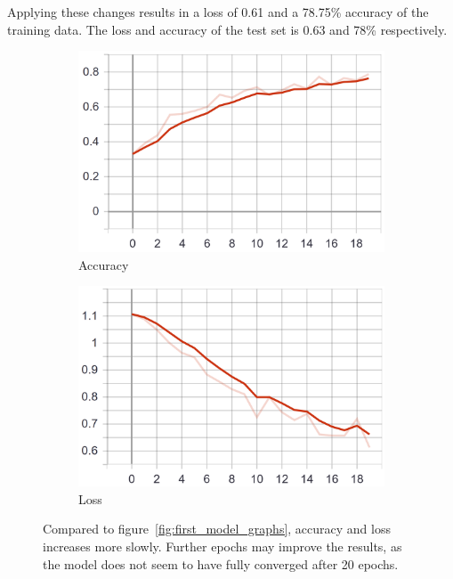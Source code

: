 Applying these changes results in a loss of 0.61 and a 78.75\% accuracy of the training data.
The loss and accuracy of the test set is 0.63 and 78\% respectively.

\begin{figure}
    \centering
    \begin{subfigure}[b]{0.4\textwidth}
        \includegraphics[width=\textwidth]{images/first_model_data_augmentation_acc.png}
        \caption{Accuracy}
        \label{fig:first_model_data_augmentation_acc}
    \end{subfigure}
    \begin{subfigure}[b]{0.4\textwidth}
        \includegraphics[width=\textwidth]{images/first_model_data_augmentation_loss.png}
        \caption{Loss}
        \label{fig:first_model_data_augmentation_loss}
    \end{subfigure}
    \caption{Compared to figure~\ref{fig:first_model_graphs}, accuracy and loss increases more slowly. Further epochs may improve the results, as the model does not seem to have fully converged after 20 epochs.}
    \label{fig:first_model_data_augmentation_graphs}
\end{figure}


